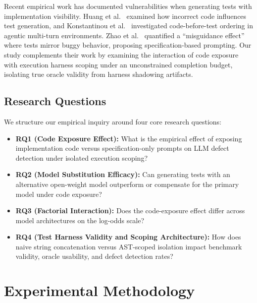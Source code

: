 \documentclass[11pt,a4paper]{article}
\begin{document}
Recent empirical work has documented vulnerabilities when generating tests with implementation visibility. Huang et al.~\cite{huang2024measuring} examined how incorrect code influences test generation, and Konstantinou et al.~\cite{konstantinou2026codingbeforetesting} investigated code-before-test ordering in agentic multi-turn environments. Zhao et al.~\cite{zhao2026misguidance} quantified a ``misguidance effect'' where tests mirror buggy behavior, proposing specification-based prompting. Our study complements their work by examining the interaction of code exposure with execution harness scoping under an unconstrained completion budget, isolating true oracle validity from harness shadowing artifacts.

\subsection{Research Questions}
We structure our empirical inquiry around four core research questions:
\begin{itemize}
    \item \textbf{RQ1 (Code Exposure Effect):} What is the empirical effect of exposing implementation code versus specification-only prompts on LLM defect detection under isolated execution scoping?
    \item \textbf{RQ2 (Model Substitution Efficacy):} Can generating tests with an alternative open-weight model outperform or compensate for the primary model under code exposure?
    \item \textbf{RQ3 (Factorial Interaction):} Does the code-exposure effect differ across model architectures on the log-odds scale?
    \item \textbf{RQ4 (Test Harness Validity and Scoping Architecture):} How does naive string concatenation versus AST-scoped isolation impact benchmark validity, oracle usability, and defect detection rates?
\end{itemize}


\section{Experimental Methodology}
\label{sec:method}
\end{document}
